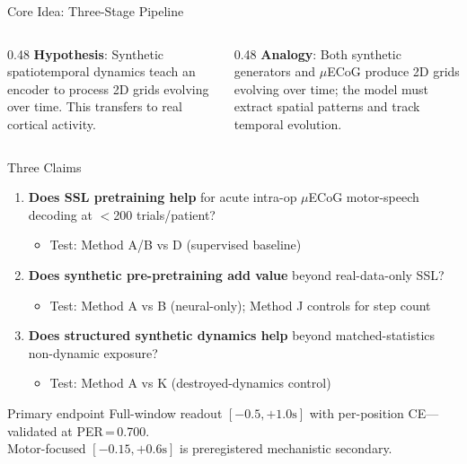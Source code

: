 \documentclass[aspectratio=169, 11pt]{beamer}
\newcommand{\mcecog}{$\mu$ECoG\xspace}
\begin{document}
\begin{frame}{Core Idea: Three-Stage Pipeline}
\vspace{0.5em}

\begin{columns}[T]
\begin{column}{0.48\textwidth}
\textbf{Hypothesis}: Synthetic spatiotemporal dynamics teach an encoder to process 2D grids evolving over time. This transfers to real cortical activity.
\end{column}
\begin{column}{0.48\textwidth}
\textbf{Analogy}: Both synthetic generators and \mcecog produce 2D grids evolving over time; the model must extract spatial patterns and track temporal evolution.
\end{column}
\end{columns}
\end{frame}


\begin{frame}{Three Claims}

\begin{enumerate}
\item \textbf{Does SSL pretraining help} for acute intra-op \mcecog motor-speech decoding at $<$200 trials/patient?
  \begin{itemize}
    \item[\scriptsize$\triangleright$] \small Test: Method A/B vs D (supervised baseline)
  \end{itemize}

\vspace{0.4em}
\item \textbf{Does synthetic pre-pretraining add value} beyond real-data-only SSL?
  \begin{itemize}
    \item[\scriptsize$\triangleright$] \small Test: Method A vs B (neural-only); Method J controls for step count
  \end{itemize}

\vspace{0.4em}
\item \textbf{Does structured synthetic dynamics help} beyond matched-statistics non-dynamic exposure?
  \begin{itemize}
    \item[\scriptsize$\triangleright$] \small Test: Method A vs K (destroyed-dynamics control)
  \end{itemize}
\end{enumerate}

\vspace{0.8em}
\begin{block}{Primary endpoint}
  Full-window readout $[-0.5, +1.0\text{s}]$ with per-position CE---validated at PER\,=\,0.700.\\
  Motor-focused $[-0.15, +0.6\text{s}]$ is preregistered mechanistic secondary.
\end{block}
\end{frame}
\end{document}
